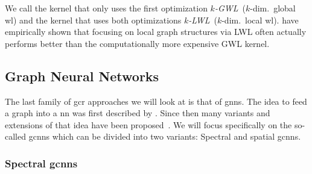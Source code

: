 We call the kernel that only uses the first optimization \textit{$k$-GWL}~($k$-dim.\ global \ac{wl}) and the kernel that uses both optimizations \textit{$k$-LWL}~($k$-dim.\ local \ac{wl}).
\citet{Morris2017} have empirically shown that focusing on local graph structures via LWL often actually performs better than the computationally more expensive GWL kernel.

\subsection{Graph Neural Networks}%
\label{sec:related:gcr:nn}

The last family of \ac{gcr} approaches we will look at is that of \acp{gnn}.
The idea to feed a graph into a \ac{nn} was first described by \citet{Gori2005}.
Since then many variants and extensions of that idea have been proposed~\cite{Wu2019}.
We will focus specifically on the so-called \acp{gcnn} which can be divided into two variants:
Spectral and spatial \acp{gcnn}.

\subsubsection{Spectral \acp{gcnn}}

